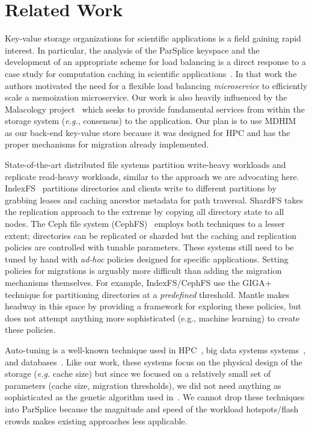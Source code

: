 \section{Related Work}

Key-value storage organizations for scientific applications is a field gaining
rapid interest. In particular, the analysis of the ParSplice keyspace and the
development of an appropriate scheme for load balancing is a direct response to
a case study for computation caching in scientific
applications~\cite{jenkins:ipdsw17-mochi}. In that work the authors motivated
the need for a flexible load balancing \emph{microservice} to efficiently scale
a memoization microservice. Our work is also heavily influenced by the
Malacology project~\cite{sevilla:eurosys17-malacology} which seeks to provide
fundamental services from within the storage system ({\it e.g.}, consensus) to
the application.  Our plan is to use
MDHIM~\cite{greenberg:hotstorage2015-mdhim} as our back-end key-value store
because it was designed for HPC and has the proper mechanisms for migration
already implemented.  

State-of-the-art distributed file systems partition write-heavy workloads and
replicate read-heavy workloads, similar to the approach we are advocating
here.  IndexFS~\cite{ren:sc2014-indexfs} partitions directories and clients
write to different partitions by grabbing leases and caching ancestor metadata
for path traversal. ShardFS takes the replication approach to the extreme by
copying all directory state to all nodes. The Ceph file system
(CephFS)~\cite{weil:sc2004-dyn-metadata, weil:osdi2006-ceph} employs both
techniques to a lesser extent; directories can be replicated or sharded but the
caching and replication policies are controlled with tunable parameters.  These
systems still need to be tuned by hand with {\it ad-hoc} policies designed for
specific applications.  Setting policies for migrations is arguably more
difficult than adding the migration mechanisms themselves.  For example,
IndexFS/CephFS use the GIGA+~\cite{patil:fast2011-giga} technique for
partitioning directories at a \emph{predefined} threshold. Mantle makes headway
in this space by providing a framework for exploring these policies, but does
not attempt anything more sophisticated (e.g., machine learning) to create
these policies. 

Auto-tuning is a well-known technique used in
HPC~\cite{behzad:sc2013-autotuning, behzad:techreport2014-io-autotuning}, big
data systems systems~\cite{herodotou_starfish_2011}, and
databases~\cite{schnaitter_index_2009}.  Like our work, these systems focus on
the physical design of the storage ({\it e.g.} cache size) but since we focused
on a relatively small set of parameters (cache size, migration thresholds), we
did not need anything as sophisticated as the genetic algorithm used
in~\cite{behzad:sc2013-autotuning}.  We cannot drop these techniques into
ParSplice because the magnitude and speed of the workload hotspots/flash crowds
makes existing approaches less applicable. 

